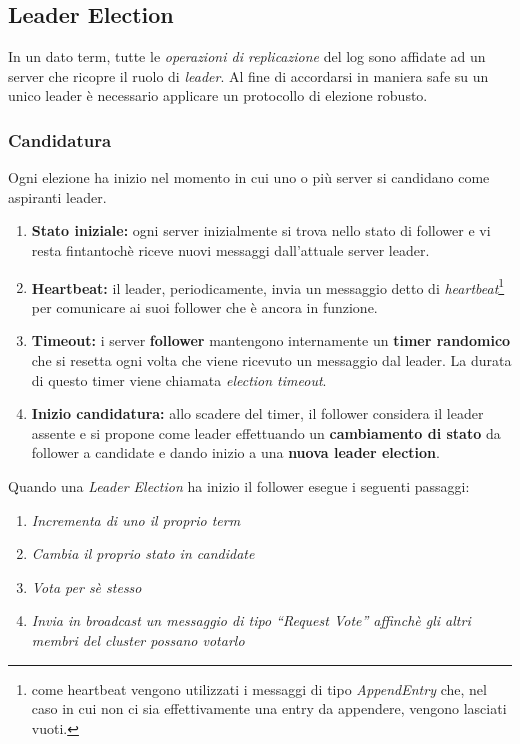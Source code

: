 \subsection{Leader Election}
\label{Leader Election}
In un dato term, tutte le \textit{operazioni di replicazione} del log sono affidate ad un server che ricopre il ruolo di \textit{leader}. Al fine di accordarsi in maniera safe su un unico leader è necessario applicare un protocollo di elezione robusto.  

	\subsubsection{Candidatura}
	Ogni elezione ha inizio nel momento in cui uno o più server si candidano come aspiranti leader.

	\begin{enumerate}
		\item{\textbf{Stato iniziale:}}	ogni server inizialmente si trova nello stato di follower e vi resta fintantochè riceve nuovi messaggi dall'attuale server leader.
		\item{\textbf{Heartbeat:}} il leader, periodicamente, invia un messaggio detto di \textit{heartbeat}\footnote{come heartbeat vengono utilizzati i messaggi di tipo \textit{AppendEntry} che, nel caso in cui non ci sia effettivamente una entry da appendere, vengono lasciati vuoti.} 
		per comunicare ai suoi follower che è ancora in funzione.
		\item{\textbf{Timeout:}} i server \textbf{follower} mantengono internamente un \textbf{timer randomico} che si resetta ogni volta che viene ricevuto un messaggio dal leader. La durata di questo timer viene chiamata \textit{election timeout}.		
		\item{\textbf{Inizio candidatura:}} allo scadere del timer, il follower considera il leader assente e si propone come leader effettuando un \textbf{cambiamento di stato} da follower a candidate e dando inizio a una \textbf{nuova leader election}.
	\end{enumerate}


Quando una \textit{Leader Election} ha inizio il follower esegue i seguenti passaggi:

\begin{enumerate}
	\item{\emph{Incrementa di uno il proprio term}}
	\item{\emph{Cambia il proprio stato in candidate}}
	\item{\emph{Vota per sè stesso}}
	\item{\emph{Invia in broadcast un messaggio di tipo ``Request Vote'' affinchè gli altri membri del cluster possano votarlo}}
\end{enumerate}
 
